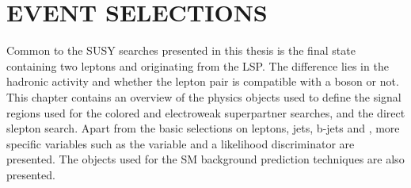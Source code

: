 \chapter{EVENT SELECTIONS}\label{sec:eventSelection}
\noindent
\justify
Common to the SUSY searches presented in this thesis is the final state containing two leptons and \ptmiss originating from the LSP.
The difference lies in the hadronic activity and whether the lepton pair is compatible with a \PZ boson or not. 
This chapter contains an overview of the physics objects used to define the signal regions used for the colored and electroweak superpartner searches, and the direct slepton search. 
Apart from the basic selections on leptons, jets, b-jets and \ptmiss, more specific variables such as the \mttwo variable and a \ttbar likelihood discriminator are presented. 
The objects used for the SM background prediction techniques are also presented. 
